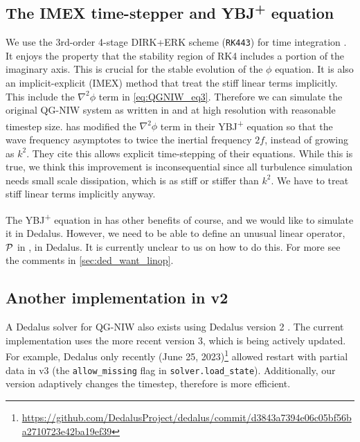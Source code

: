 \subsection{The IMEX time-stepper and YBJ\textsuperscript{+} equation}
We use the 3rd-order 4-stage DIRK+ERK scheme (\texttt{RK443}) for time integration \parencite[Sec 2.8]{AscherEtAl_97}. It enjoys the property that the stability region of RK4 includes a portion of the imaginary axis. This is crucial for the stable evolution of the $\phi$ equation. It is also an implicit-explicit (IMEX) method that treat the stiff linear terms implicitly. This include the $\nabla^2\phi$ term in \eqref{eq:QGNIW_eq3}. Therefore we can simulate the original QG-NIW system as written in \cite{XieVanneste_15} and \cite{RochaEtAl_18} at high resolution with reasonable timestep size. \cite{AsselinYoung_19} has modified the $\nabla^2\phi$ term in their YBJ\textsuperscript{+} equation so that the wave frequency asymptotes to twice the inertial frequency $2f$, instead of growing as $k^2$. They cite this allows explicit time-stepping of their equations. While this is true, we think this improvement is inconsequential since all turbulence simulation needs small scale dissipation, which is as stiff or stiffer than $k^2$. We have to treat stiff linear terms implicitly anyway. 

The YBJ\textsuperscript{+} equation in \cite{AsselinYoung_19} has other benefits of course, and we would like to simulate it in Dedalus. However, we need to be able to define an unusual linear operator, $\mathcal{P}$ in \cite[(3.2)]{Xie_20}, in Dedalus. It is currently unclear to us on how to do this. For more see the comments in \ref{sec:ded_want_linop}.

\subsection{Another implementation in v2}
A Dedalus solver for QG-NIW also exists using Dedalus version 2 \parencite{Conn_2023}. The current implementation uses the more recent version 3, which is being actively updated. For example, Dedalus only recently (June 25, 2023)\footnote{\url{https://github.com/DedalusProject/dedalus/commit/d3843a7394e06c05bf56ba2710723e42ba19ef39}\;} allowed restart with partial data in v3 (the \verb|allow_missing| flag in \verb|solver.load_state|). Additionally, our version adaptively changes the timestep, therefore is more efficient. 
